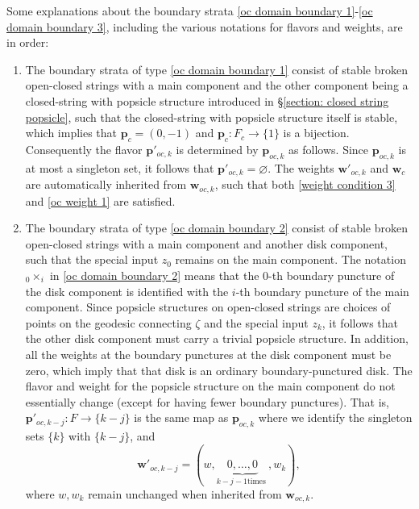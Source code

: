 \documentclass[11pt]{amsproc}
\theoremstyle{remark}
\numberwithin{equation}{section}
\begin{document}
Some explanations about the boundary strata \eqref{oc domain boundary 1}-\eqref{oc domain boundary 3},
including the various notations for flavors and weights, are in order:
\begin{enumerate}[label=(\roman*)]

\item The boundary strata of type \eqref{oc domain boundary 1} consist of stable broken open-closed strings with a main component and the other component being a closed-string with popsicle structure introduced in \S\ref{section: closed string popsicle},
such that the closed-string with popsicle structure itself is stable, 
which implies that $\mathbf{p}_{c} = (0, -1)$ and $\mathbf{p}_{c}: F_{c} \to \{1\}$ is a bijection.
Consequently the flavor $\mathbf{p}'_{oc, k}$ is determined by $\mathbf{p}_{oc, k}$ as follows.
Since $\mathbf{p}_{oc, k}$ is at most a singleton set, 
it follows that $\mathbf{p}'_{oc, k} = \varnothing$.
The weights $\mathbf{w}'_{oc, k}$ and $\mathbf{w}_{c}$ are automatically inherited from $\mathbf{w}_{oc, k}$,
such that both \eqref{weight condition 3} and \eqref{oc weight 1} are satisfied. 

\item The boundary strata of type \eqref{oc domain boundary 2} consist of stable broken open-closed strings with a main component and another disk component,
such that the special input $z_{0}$ remains on the main component.
The notation ${}_{0} \times_{i}$ in \eqref{oc domain boundary 2} means that the $0$-th boundary puncture of the disk component is identified with the $i$-th boundary puncture of the main component.
Since popsicle structures on open-closed strings are choices of points on the geodesic connecting $\zeta$ and the special input $z_{k}$,
it follows that the other disk component must carry a trivial popsicle structure.
In addition, all the weights at the boundary punctures at the disk component must be zero,
which imply that that disk is an ordinary boundary-punctured disk.
The flavor and weight for the popsicle structure on the main component do not essentially change (except for having fewer boundary punctures).
That is, $\mathbf{p}'_{oc, k-j}: F \to \{k-j\}$ is the same map as $\mathbf{p}_{oc, k}$ where we identify the singleton sets $\{k\}$ with $\{k-j\}$,
and
\begin{equation}
\mathbf{w}'_{oc, k-j} = (w, \underbrace{0, \ldots, 0}_{k-j-1 \text{times }}, w_{k}),
\end{equation}
where $w, w_{k}$ remain unchanged when inherited from $\mathbf{w}_{oc, k}$.


\end{enumerate}
\end{document}
